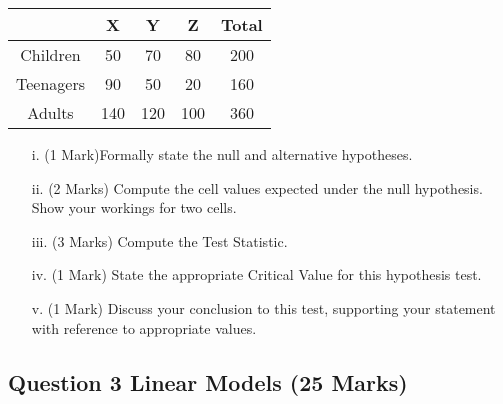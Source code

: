 \documentclass[a4paper,12pt]{article}
\begin{document}
{
	\large
	\begin{center}
		\begin{tabular}{|c|c|c|c|c|}
			\hline
			& X & Y & Z &  Total\\ \hline
			Children  & 50 & 70 & 80 & 200 \\ \hline
			Teenagers  & 90 & 50 & 20 &  160\\ \hline
			Adults  & 140 & 120 & 100 & 360\\ \hline
		\end{tabular} 
	\end{center}
}
\begin{itemize}
	\item[i.](1 Mark)Formally state the null and alternative hypotheses.
	\item[ii.] (2 Marks) Compute the cell values expected under the null hypothesis. Show your workings for two cells.
	\item[iii.](3 Marks) Compute the Test Statistic.
	\item[iv.](1 Mark) State the appropriate Critical Value for this hypothesis test.
	\item[v.](1 Mark) Discuss your conclusion to this test, supporting your statement with reference to appropriate values.
\end{itemize}
\newpage

	\newpage
\subsection*{Question 3 Linear Models (25 Marks)}
	
\end{document}
